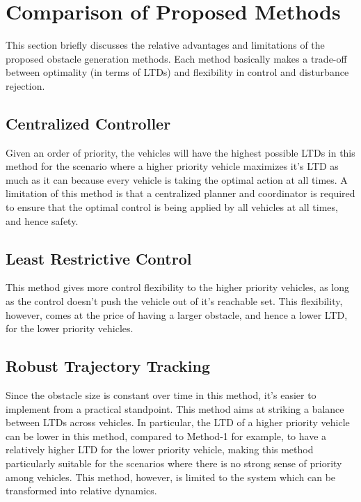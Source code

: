%

\section{Comparison of Proposed Methods}
This section briefly discusses the relative advantages and limitations of the proposed obstacle generation methods. Each method basically makes a trade-off between optimality (in terms of LTDs) and flexibility in control and disturbance rejection.

\subsection{Centralized Controller}
Given an order of priority, the vehicles will have the highest possible LTDs in this method for the scenario where a higher priority vehicle maximizes it's LTD as much as it can because every vehicle is taking the optimal action at all times. 
A limitation of this method is that a centralized planner and coordinator is required to ensure that the optimal control is being applied by all vehicles at all times, and hence safety.

\subsection{Least Restrictive Control}
This method gives more control flexibility to the higher priority vehicles, as long as the control doesn't push the vehicle out of it's reachable set. This flexibility, however, comes at the price of having a larger obstacle, and hence a lower LTD, for the lower priority vehicles.  

\subsection{Robust Trajectory Tracking}
Since the obstacle size is constant over time in this method, it's easier to implement from a practical standpoint. This method aims at striking a balance between LTDs across vehicles. In particular, the LTD of a higher priority vehicle can be lower in this method, compared to Method-1 for example, to have a relatively higher LTD for the lower priority vehicle, making this method particularly suitable for the scenarios where there is no strong sense of priority among vehicles. This method, however, is limited to the system which can be transformed into relative dynamics.